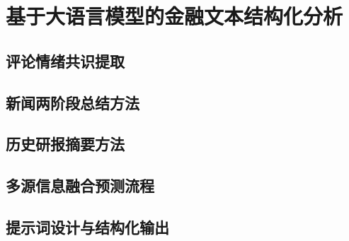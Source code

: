
\chapter{基于大语言模型的金融文本结构化分析}

\section{评论情绪共识提取}

\section{新闻两阶段总结方法}

\section{历史研报摘要方法}

\section{多源信息融合预测流程}

\section{提示词设计与结构化输出}
